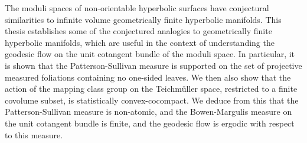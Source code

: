 The moduli spaces of non-orientable hyperbolic surfaces have conjectural similarities to infinite volume geometrically finite hyperbolic manifolds.
This thesis establishes some of the conjectured analogies to geometrically finite hyperbolic manifolds, which are useful in the context of understanding the geodesic flow on the unit cotangent bundle of the moduli space.
In particular, it is shown that the Patterson-Sullivan measure is supported on the set of projective measured foliations containing no one-sided leaves.
We then also show that the action of the mapping class group on the Teichmüller space, restricted to a finite covolume subset, is statistically convex-cocompact.
We deduce from this that the Patterson-Sullivan measure is non-atomic, and the Bowen-Margulis measure on the unit cotangent bundle is finite, and the geodesic flow is ergodic with respect to this measure.

